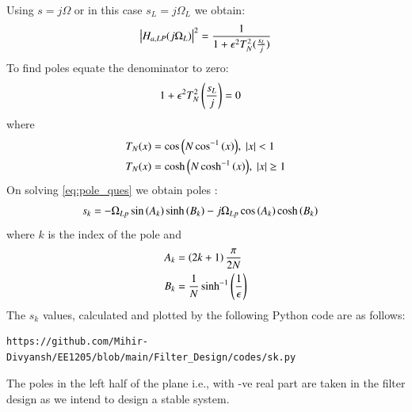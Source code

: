 \documentclass[journal,12pt,twocolumn]{IEEEtran}
\theoremstyle{remark}
\begin{document}
\begin{enumerate}
Using $s=j\Omega$ or in this case $s_{L}=j\Omega_{L}$ we obtain:
\begin{align}
    \left\vert H_{a,LP}(j\Omega_L)\right\vert^2 = \dfrac{1}{1 + \epsilon^2T_N^2(\frac{s_L}{j})}
\end{align}
To find poles equate the denominator to zero:
\begin{align}
    {1 + \epsilon^2T_N^2\ensuremath{\left(\dfrac{s_L}{j}\right)}} &=0 \label{eq:pole_ques}
\end{align}
where 
\begin{align}
    T_N(x) &= \cos{\ensuremath{\left(N\cos^{-1}{\left(x\right)}\right)}},  \;\left\vert x\right\vert < 1  \\
    T_N(x) &= \cosh{\ensuremath{\left(N\cosh^{-1}{\left(x\right)}\right)}},  \;\left\vert x\right\vert\geq 1
\end{align}
On solving \eqref{eq:pole_ques} we obtain poles :
\begin{align}
    s_{k} &= -\Omega_{Lp} \sin\left(A_k\right)\sinh\left(B_k\right) - j\Omega_{Lp}\cos\left(A_k\right)\cosh\left(B_k\right)
\end{align}
where $k$ is the index of the pole and \\
\begin{align}
    A_k &= \left(2k+1\right)\dfrac{\pi}{2N}\\
    B_k &= \dfrac{1}{N} \sinh^{-1}{\left(\dfrac{1}{\epsilon}\right)}
\end{align}
The $s_k$ values, calculated and plotted by the following Python code are as follows: 
\begin{lstlisting}
https://github.com/Mihir-Divyansh/EE1205/blob/main/Filter_Design/codes/sk.py
\end{lstlisting}
\renewcommand\thetable{\thesection-\arabic{table}} 

The poles in the left half of the plane i.e., with -ve real part are taken in the filter design as we intend to design a stable system.


\end{enumerate}
\end{document}

